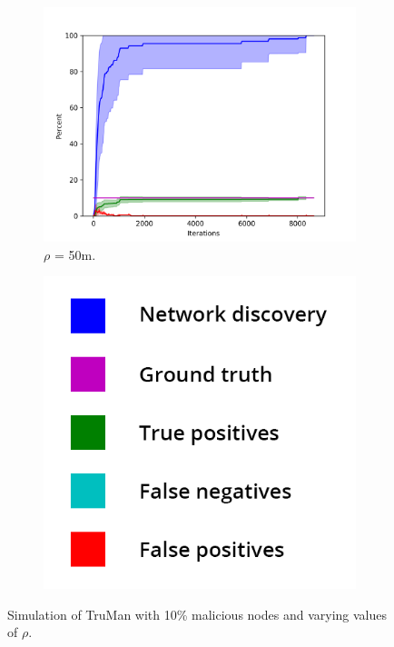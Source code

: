\begin{figure}
\centering
\begin{subfigure}{0.5\textwidth}
\includegraphics[width=\linewidth]{images/plots/Network_rA_10.0/new_plots/50_10.png}
\caption{$\rho$ = 50m.} 
\label{fig:random50}
\end{subfigure}
\hspace*{\fill} %
\begin{subfigure}{0.3\textwidth}
\includegraphics[width=\linewidth]{images/legend2.png}
\end{subfigure}


\caption{Simulation of TruMan with 10\% malicious nodes and varying values of $\rho$.}
\label{fig:random103050}
\end{figure}

